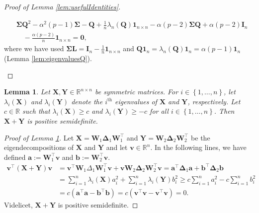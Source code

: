 \documentclass[12pt]{article}
\theoremstyle{plain}
\newtheorem{lemma}[theorem]{Lemma}
\theoremstyle{remark}
\newcommand{\curly}[1]{\left\{ #1 \right\}}
\newcommand{\R}[0]{\mathbb{R}}
\newcommand{\onen}[0]{{\mathbf{1}_{n}}}
\newcommand{\onenn}[0]{{\mathbf{1}_{n\times n}}}
\newcommand{\dVec}[1]{{\bm{#1}}}            %
\newcommand{\latMatr}[1]{\mathbf{#1}}          %
\newcommand{\grMatr}[1]{{\boldsymbol{#1}}}   %
\newcommand{\matr}[1]{\mathbf{#1}}          %
\begin{document}
\begin{proof}[Proof of Lemma \ref{lem:usefulIdentities}]
\begin{enumerate}
\begin{align*}
                &{\grMatr{\Sigma}} \latMatr Q^2 - \alpha^2 (p-1) {\grMatr{\Sigma}} - \latMatr Q + \frac{1}{n} \lambda_n(\latMatr Q) \onenn - \alpha (p-2) {\grMatr{\Sigma}} \latMatr Q + \alpha (p-2) \latMatr{I}_n \\
                &\quad - \frac{\alpha (p-2)}{n} \onenn=\matr 0,
            \end{align*}
            where we have used ${\grMatr{\Sigma}} {\latMatr{L}}= \latMatr{I}_n -\frac{1}{n} \onenn$ and $\latMatr Q \onen = \lambda_n(\latMatr Q) \onen= \alpha(p-1) \onen$ (Lemma \ref{lem:eigenvaluesQ}). 
        \end{enumerate}
    \end{proof}
    
    
    \begin{lemma}
        \label{lem:sumOfMatricesPD}
        Let $\latMatr X,\latMatr Y\in\R^{n\times n}$ be symmetric matrices. For $i\in\curly{1,\dots,n}$, let $\lambda_i(\latMatr X)$ and $\lambda_i(\latMatr Y)$ denote the $i^\text{th}$ eigenvalues of $\latMatr X$ and $\latMatr Y$, respectively. Let $c\in\R$ such that $\lambda_i(\latMatr X)\geq c$ and $\lambda_i(\latMatr Y)\geq -c$ for all $i\in\curly{1,\dots,n}$. Then $\latMatr X+\latMatr Y$ is positive semidefinite.
    \end{lemma}
    \begin{proof}[Proof of Lemma \ref{lem:sumOfMatricesPD}]
        Let $\latMatr X=\latMatr W_1\grMatr{\Delta}_1 \latMatr W_1^\top$ and $\latMatr Y=\latMatr W_2\grMatr{\Delta}_2 \latMatr W_2^\top$ be the eigendecompositions of $\latMatr X$ and $\latMatr Y$ and let $\dVec v\in\R^n$. In the following lines, we have defined $\dVec a:=\latMatr W_1^\top \dVec v$ and $\dVec b:= \latMatr W_2^\top \dVec v$.
        \begin{align*}
            \dVec v^\top (\latMatr X+\latMatr Y) \dVec v&=\dVec v^\top \latMatr W_1 \Delta_1 \latMatr W_1^\top \dVec v +\dVec v \latMatr W_2 \grMatr{\Delta}_2 \latMatr W_2^\top\dVec v= \dVec a^\top \grMatr{\Delta}_1\dVec a +\dVec b^\top \grMatr{\Delta}_2\dVec b \\
            & = \sum_{i=1}^n\lambda_i(\latMatr X) a_i^2 + \sum_{i=1}^n \lambda_i(\latMatr Y) b_i^2\geq c \sum_{i=1}^n a_i^2 - c \sum_{i=1}^n  b_i^2\\
            &=c(\dVec a^\top \dVec a - \dVec b^\top \dVec b) = c(\dVec v^\top \dVec v-\dVec v^\top \dVec v)=0. 
        \end{align*}
        Videlicet, $\latMatr X+\latMatr Y$ is positive semidefinite.
    \end{proof}
    
\end{document}
